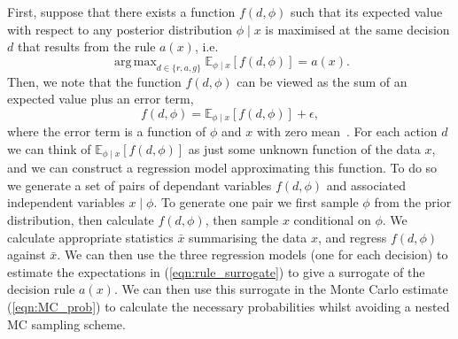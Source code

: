 \documentclass{article} %
\DeclareMathOperator*{\argmax}{arg\,max}
\begin{document}
First, suppose that there exists a function $f(d, \phi)$ such that its expected value with respect to any posterior distribution $\phi \mid x$ is maximised at the same decision $d$ that results from the rule $a(x)$, i.e.
\begin{equation} \label{eqn:rule_surrogate}
\argmax_{d \in \{r, a, g\}} \mathbb{E}_{\phi \mid x} [f(d, \phi)] = a(x).
\end{equation}
Then, we note that the function $f(d, \phi)$ can be viewed as the sum of an expected value plus an error term,
\begin{equation}
f(d, \phi) = \mathbb{E}_{\phi \mid x} [f(d, \phi)] + \epsilon,
\end{equation}
where the error term is a function of $\phi$ and $x$ with zero mean~\cite{Strong2015}. For each action $d$ we can think of $\mathbb{E}_{\phi \mid x} [f(d, \phi)]$ as just some unknown function of the data $x$, and we can construct a regression model approximating this function. To do so we generate a set of pairs of dependant variables $f(d, \phi)$ and associated independent variables $x \mid \phi$. To generate one pair we first sample $\phi$ from the prior distribution, then calculate $f(d, \phi)$, then sample $x$ conditional on $\phi$. We calculate appropriate statistics $\bar{x}$ summarising the data $x$, and regress $f(d, \phi)$ against $\bar{x}$. We can then use the three regression models (one for each decision) to estimate the expectations in (\ref{eqn:rule_surrogate}) to give a surrogate of the decision rule $a(x)$. We can then use this surrogate in the Monte Carlo estimate (\ref{eqn:MC_prob}) to calculate the necessary probabilities whilst avoiding a nested MC sampling scheme.
\end{document}
